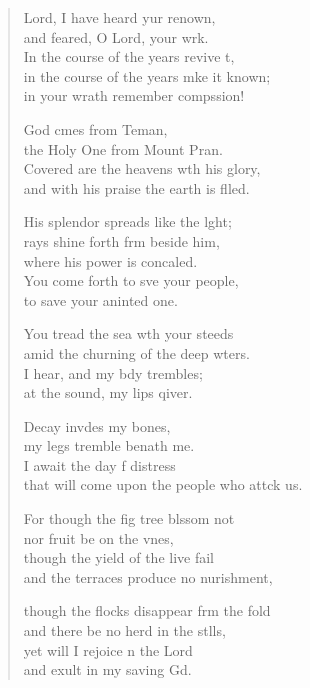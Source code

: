 \settowidth{\versewidth}{that will come upon the people who attack us.}
\begin{verse}%
  \begin{patverse}
 Lord, I have heard yur renown,\Med\\
and feared, O Lord, your wrk.\\
In the course of the years revive \pointup{\i}t,\Flex\\
in the course of the years mke it known;\Med\\
in your wrath remember compssion!

God cmes from Teman,\Med\\
the Holy One from Mount Pran.\\
Covered are the heavens w\pointup{\i}th his glory,\Med\\
and with his praise the earth is f\pointup{\i}lled.

His splendor spreads like the l\pointup{\i}ght;\Flex\\
rays shine forth frm beside him,\Med\\
where his power is concaled.\\
You come forth to sve your people,\Med\\
to save your aninted one.

You tread the sea w\pointup{\i}th your steeds\Med\\
amid the churning of the deep wters.\\
I hear, and my bdy trembles;\Med\\
at the sound, my lips qiver.

Decay invdes my bones,\Med\\
my legs tremble benath me.\\
I await the day f distress\Med\\
that will come upon the people who attck us.

For though the fig tree blssom not\Med\\
nor fruit be on the v\pointup{\i}nes,\\
though the yield of the live fail\Med\\
and the terraces produce no nurishment,

though the flocks disappear frm the fold\Med\\
and there be no herd in the stlls,\\
yet will I rejoice \pointup{\i}n the Lord\Med\\
and exult in my saving Gd.


\end{patverse}
\end{verse}
